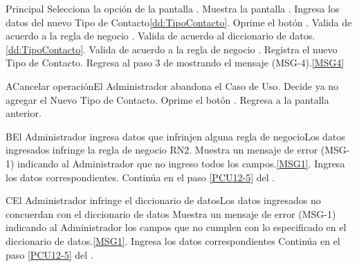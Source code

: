 	\begin{UCtrayectoria}{Principal}
			\UCpaso[\UCactor] Selecciona la opción  de la pantalla .
			\UCpaso Muestra la pantalla .
			\UCpaso [\UCactor] Ingresa los datos del nuevo Tipo de Contacto\ref{dd:TipoContacto}.
			\UCpaso [\UCactor] Oprime el botón .\label{PCU12-5}
                        \UCpaso Valida de acuerdo a la regla de negocio .  
                        \UCpaso Valida de acuerdo al diccionario de datos. \ref{dd:TipoContacto}.
                        \UCpaso Valida de acuerdo a la regla de negocio . 
			\UCpaso Registra el nuevo Tipo de Contacto.
			\UCpaso Regresa al paso 3 de mostrando el mensaje (MSG-4).\ref{MSG4}
	\end{UCtrayectoria}

	\begin{UCtrayectoriaA}{A}{Cancelar operación}{El Administrador abandona el Caso de Uso.}
			\UCpaso[\UCactor] Decide ya no agregar el Nuevo Tipo de Contacto.
			\UCpaso[\UCactor] Oprime el botón .
			\UCpaso Regresa a la pantalla anterior.
	\end{UCtrayectoriaA}

        \begin{UCtrayectoriaA}{B}{El Administrador ingresa datos que infrinjen alguna regla de negocio}{Los datos ingresados infringe la regla de negocio RN2.}
                        \UCpaso Muestra un mensaje de error (MSG-1) indicando al Administrador que no ingreso todos los campos.\ref{MSG1}.
			\UCpaso[\UCactor] Ingresa los datos correspondientes.
			\UCpaso Continúa en el paso \ref{PCU12-5} del .
	\end{UCtrayectoriaA}
		
        \begin{UCtrayectoriaA}{C}{El Administrador infringe el diccionario de datos}{Los datos ingresados no concuerdan con el diccionario de datos}
                        \UCpaso Muestra un mensaje de error (MSG-1) indicando al Administrador los campos que no cumplen con lo especificado en el diccionario de datos.\ref{MSG1}.
			\UCpaso[\UCactor] Ingresa los datos correspondientes
			\UCpaso Continúa en el paso \ref{PCU12-5} del .
	\end{UCtrayectoriaA}

